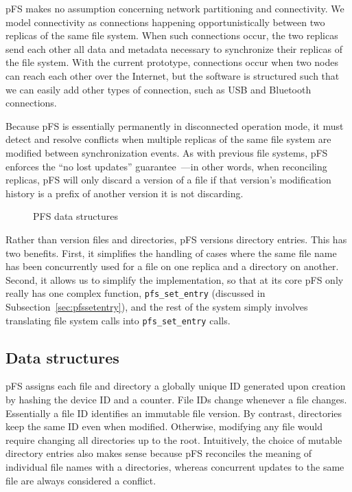 pFS makes no assumption concerning network partitioning and
connectivity.  We model connectivity as connections happening
opportunistically between two replicas of the same file system.  When
such connections occur, the two replicas send each other all data and
metadata necessary to synchronize their replicas of the file system.
With the current prototype, connections occur when two nodes can reach
each other over the Internet, but the software is structured such that
we can easily add other types of connection, such as USB and Bluetooth
connections.


Because pFS is essentially permanently in disconnected operation mode,
it must detect and resolve conflicts when multiple replicas of the
same file system are modified between synchronization events.  As with
previous file systems, pFS enforces the ``no lost updates''
guarantee~\cite{page:ficus}---in other words, when reconciling
replicas, pFS will only discard a version of a file if that version's
modification history is a prefix of another version it is not
discarding.

\begin{figure*}
\centerline{}
\caption{PFS data structures}
\label{fig:struct}
\end{figure*}

Rather than version files and directories, pFS versions directory
entries.  This has two benefits.  First, it simplifies the handling of
cases where the same file name has been concurrently used for a file
on one replica and a directory on another.  Second, it allows us to
simplify the implementation, so that at its core pFS only really has
one complex function, \texttt{pfs\_set\_entry} (discussed in
Subsection~\ref{sec:pfssetentry}), and the rest of the system simply
involves translating file system calls into \texttt{pfs\_set\_entry}
calls.

\subsection{Data structures}

pFS assigns each file and directory a globally unique ID generated
upon creation by hashing the device ID and a counter.  File IDs change
whenever a file changes.  Essentially a file ID identifies an
immutable file version.  By contrast, directories keep the same ID
even when modified.  Otherwise, modifying any file would require
changing all directories up to the root.  Intuitively, the choice of
mutable directory entries also makes sense because pFS reconciles the
meaning of individual file names with a directories, whereas
concurrent updates to the same file are always considered a conflict.

